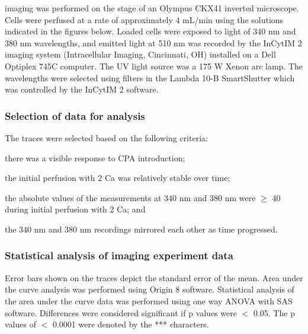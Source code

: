 \Ca{} imaging was performed on the stage of an Olympus CKX41 inverted microscope. Cells were perfused at a rate of approximately 4 mL/min using the solutions indicated in the figures below. Loaded cells were exposed to light of 340 nm and 380 nm wavelengths, and emitted light at 510 nm was recorded by the InCytIM 2 imaging system (Intracellular Imaging, Cincinnati, OH) installed on a Dell Optiplex 745C computer. The UV light source was a 175 W Xenon arc lamp. The wavelengths were selected using filters in the Lambda 10-B SmartShutter which was controlled by the InCytIM 2 software. 


\subsubsection{Selection of data for analysis}
The traces were selected based on the following criteria: 
\begin{inparaenum}[(i)]
\item there was a visible response to CPA introduction; 
\item the initial perfusion with 2 Ca was relatively stable over time;
\item the absolute values of the measurements at 340 nm and 380 nm were $\ge$ 40 during initial perfusion with 2 Ca; and
\item the 340 nm and 380 nm recordings mirrored each other as time progressed.
\end{inparaenum}

\subsubsection{Statistical analysis of imaging experiment data}
Error bars shown on the traces depict the standard error of the mean. Area under the curve analysis was performed using Origin 8 software. Statistical analysis of the area under the curve data was performed using one way ANOVA with SAS software. 
Differences were considered significant if p values were $<$ 0.05. The p values of $<$ 0.0001 were denoted by the *** characters.

